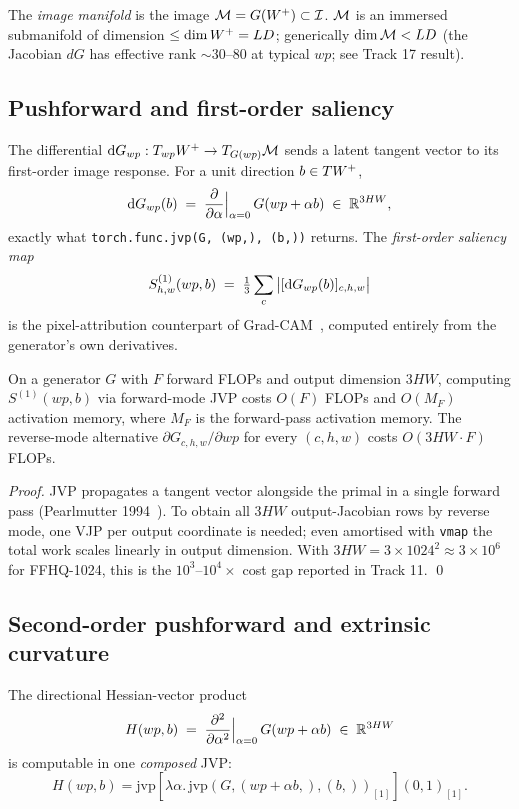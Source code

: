 The \emph{image manifold} is the image $\mathcal{M} = G(W^+) \subset \mathcal{I}$.
$\mathcal{M}$ is an immersed submanifold of dimension $\leq \dim W^+ = LD$;
generically $\dim \mathcal{M} < LD$ (the Jacobian $dG$ has effective rank
$\sim 30$--$80$ at typical $wp$; see Track 17 result).

\subsection{Pushforward and first-order saliency}
The differential $\mathrm{d}G_{wp} : T_{wp}W^+ \to T_{G(wp)}\mathcal{M}$ sends a
latent tangent vector to its first-order image response. For a unit
direction $b \in TW^+$,
\begin{equation}
  \mathrm{d}G_{wp}(b) \;=\;
  \frac{\partial}{\partial \alpha}\Big|_{\alpha=0}\, G(wp + \alpha b)
  \;\in\; \mathbb{R}^{3HW},
\end{equation}
exactly what \texttt{torch.func.jvp(G, (wp,), (b,))} returns. The
\emph{first-order saliency map}
\begin{equation}
  S^{(1)}_{h,w}(wp, b) \;=\; \tfrac{1}{3}\sum_c
  \big| [\mathrm{d}G_{wp}(b)]_{c,h,w} \big|
\end{equation}
is the pixel-attribution counterpart of
Grad-CAM~\cite{Selvaraju2017GradCAM}, computed entirely from the
generator's own derivatives.

\begin{proposition}
\label{prop:fwd-cost}
On a generator $G$ with $F$ forward FLOPs and output dimension
$3HW$, computing $S^{(1)}(wp, b)$ via forward-mode JVP costs
$O(F)$ FLOPs and $O(M_F)$ activation memory, where $M_F$ is the
forward-pass activation memory. The reverse-mode alternative
$\partial G_{c,h,w}/\partial wp$ for every $(c,h,w)$ costs
$O(3HW \cdot F)$ FLOPs.
\end{proposition}
\begin{proof}
JVP propagates a tangent vector alongside the primal in a single
forward pass (Pearlmutter 1994~\cite{Pearlmutter1994HVP}). To
obtain all $3HW$ output-Jacobian rows by reverse mode, one VJP per
output coordinate is needed; even amortised with \texttt{vmap} the
total work scales linearly in output dimension. With $3HW =
3 \times 1024^2 \approx 3 \times 10^6$ for FFHQ-1024, this is the
$10^3$--$10^4 \times$ cost gap reported in Track 11.
\qed
\end{proof}

\subsection{Second-order pushforward and extrinsic curvature}
The directional Hessian-vector product
\begin{equation}
  H(wp, b) \;=\;
  \frac{\partial^2}{\partial \alpha^2}\Big|_{\alpha=0}\, G(wp + \alpha b)
  \;\in\; \mathbb{R}^{3HW}
\end{equation}
is computable in one \emph{composed} JVP:
\begin{equation}
  H(wp, b) =
  \mathrm{jvp}\!\left[\lambda\alpha\!.\,
  \mathrm{jvp}(G,(wp\!+\!\alpha b,),(b,))_{[1]}\right]\!(0,1)_{[1]}.
\end{equation}

